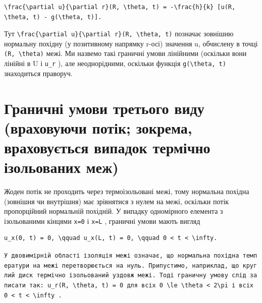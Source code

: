 \documentclass[
  ukrainian,
]{article}
\begin{document}
\begin{verbatim}
\frac{\partial u}{\partial r}(R, \theta, t) = -\frac{h}{k} [u(R, \theta, t) - g(\theta, t)].
\end{verbatim}

Тут
\texttt{\textbackslash{}frac\{\textbackslash{}partial\ u\}\{\textbackslash{}partial\ r\}(R,\ \textbackslash{}theta,\ t)}
позначає зовнішню нормальну похідну (у позитивному напрямку r-осі)
значення u, обчислену в точці \texttt{(R,\ \textbackslash{}theta)} межі.
Ми назвемо такі граничні умови лінійними (оскільки вони лінійні в U і
\texttt{u\_r} ), але неоднорідними, оскільки функція
\texttt{g(\textbackslash{}theta,\ t)} знаходиться праворуч.

\section{Граничні умови третього виду (враховуючи потік; зокрема,
враховується випадок термічно ізольованих
меж)}\label{ux433ux440ux430ux43dux438ux447ux43dux456-ux443ux43cux43eux432ux438-ux442ux440ux435ux442ux44cux43eux433ux43e-ux432ux438ux434ux443-ux432ux440ux430ux445ux43eux432ux443ux44eux447ux438-ux43fux43eux442ux456ux43a-ux437ux43eux43aux440ux435ux43cux430-ux432ux440ux430ux445ux43eux432ux443ux454ux442ux44cux441ux44f-ux432ux438ux43fux430ux434ux43eux43a-ux442ux435ux440ux43cux456ux447ux43dux43e-ux456ux437ux43eux43bux44cux43eux432ux430ux43dux438ux445-ux43cux435ux436}

Жоден потік не проходить через термоізольовані межі, тому нормальна
похідна (зовнішня чи внутрішня) має зрівнятися з нулем на межі, оскільки
потік пропорційний нормальній похідній. У випадку одномірного елемента з
ізольованими кінцями \texttt{x=0} і \texttt{x=L} , граничні умови мають
вигляд

\begin{verbatim}
u_x(0, t) = 0, \qquad u_x(L, t) = 0, \qquad 0 < t < \infty.
\end{verbatim}

\texttt{У\ двовимірній\ області\ ізоляція\ межі\ означає,\ що\ нормальна\ похідна\ температури\ на\ межі\ перетворюється\ на\ нуль.\ Припустимо,\ наприклад,\ що\ круглий\ диск\ термічно\ ізольований\ уздовж\ межі.\ Тоді\ граничну\ умову\ слід\ записати\ так:\ \textquotesingle{}u\_r(R,\ \textbackslash{}theta,\ t)\ =\ 0\textquotesingle{}\ для\ всіх\ \textquotesingle{}0\ \textbackslash{}le\ \textbackslash{}theta\ \textless{}\ 2\textbackslash{}pi\textquotesingle{}\ і\ всіх\ \textquotesingle{}0\ \textless{}\ t\ \textless{}\ \textbackslash{}infty\textquotesingle{}\ .}
\end{document}
